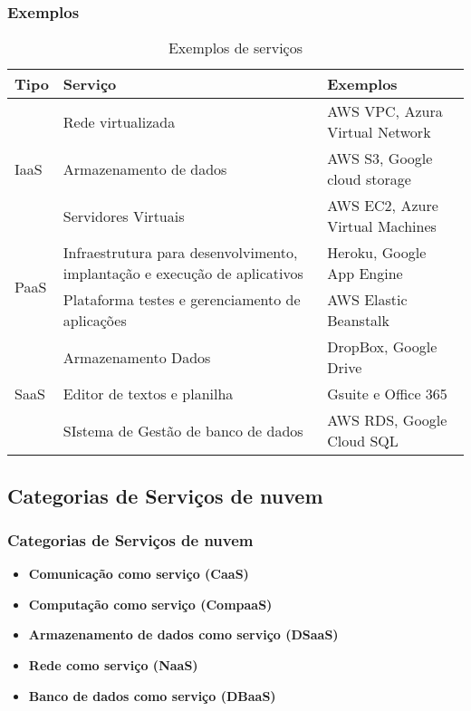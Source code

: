\begin{frame}
	\frametitle{Exemplos}
	\begin{tiny}
	\begin{table}[ht]
		\centering
		\begin{tabular}{|p{1cm}|p{5cm}|p{4cm}|}
		\hline
			Tipo & Serviço & Exemplos \\
		\hline
		\hline
		  \multirow{3}{*}{IaaS}
			& Rede virtualizada & AWS VPC, Azura Virtual Network \\
			& Armazenamento de dados & AWS S3, Google cloud storage \\
			& Servidores Virtuais & AWS EC2, Azure Virtual Machines \\
			\hline
		  \multirow{2}{*}{PaaS}
			& Infraestrutura para desenvolvimento, implantação e execução de aplicativos & Heroku, Google App Engine \\
			& Plataforma testes e gerenciamento de aplicações & AWS Elastic Beanstalk \\
			\hline
		  \multirow{3}{*}{SaaS}
			& Armazenamento Dados & DropBox, Google Drive \\
			& Editor de textos e planilha & Gsuite e Office 365 \\
			& SIstema de Gestão de banco de dados & AWS RDS, Google Cloud SQL \\
		\hline
		\end{tabular}
		\caption{Exemplos de serviços}
	\end{table}
	\end{tiny}
\end{frame}

\subsection{Categorias de Serviços de nuvem}

\begin{frame}
	\frametitle{Categorias de Serviços de nuvem}
	\begin{itemize}
		\item \textbf{Comunicação como serviço (CaaS)}
		\item \textbf{Computação como serviço (CompaaS)}
		\item \textbf{Armazenamento de dados como serviço (DSaaS)}
		\item \textbf{Rede como serviço (NaaS)}
		\item \textbf{Banco de dados como serviço (DBaaS)}
	\end{itemize}
\end{frame}

